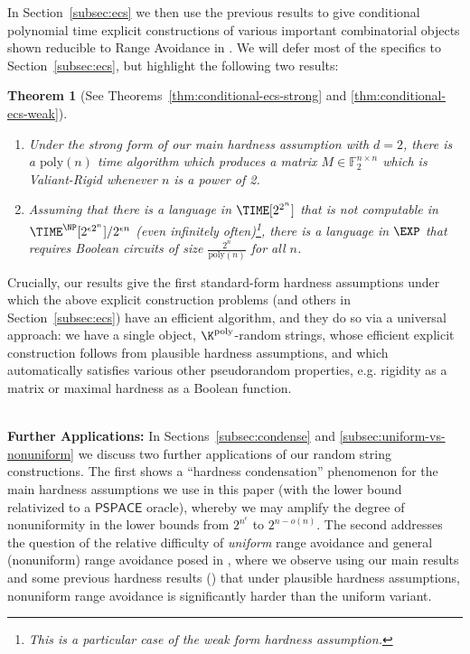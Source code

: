 \documentclass[11pt]{article}
\newtheorem*{theorem*}{Theorem}
\renewcommand{\poly}{\mathrm{poly}}
\begin{document}
In Section~\ref{subsec:ecs} we then use the previous results to give conditional polynomial time explicit constructions of various important combinatorial objects shown reducible to Range Avoidance in \cite{Korten21}. We will defer most of the specifics to Section~\ref{subsec:ecs}, but highlight the following two results:
\begin{theorem*}[See Theorems~\ref{thm:conditional-ecs-strong} and \ref{thm:conditional-ecs-weak}]
~
\begin{enumerate}
    \item Under the strong form of our main hardness assumption with $d=2$, there is a $\poly(n)$ time algorithm which produces a matrix $M \in \mathbb{F}_2^{n \times n}$ which is Valiant-Rigid whenever $n$ is a power of 2.
    \item Assuming that there is a language in $\TIME[2^{2^n}]$ that is not computable in $\TIME^\NP[2^{\epsilon 2^n}]/2^{\epsilon n}$ (even infinitely often)\footnote{This is a particular case of the weak form hardness assumption.}, there is a language in $\EXP$ that requires Boolean circuits of size $\frac{2^n}{\poly(n)}$ for all $n$.
\end{enumerate}
\end{theorem*}

Crucially, our results give the first standard-form hardness assumptions under which the above explicit construction problems (and others in Section~\ref{subsec:ecs}) have an efficient algorithm, and they do so via a universal approach: we have a single object, $\K^{\poly}$-random strings, whose efficient explicit construction follows from plausible hardness assumptions, and which automatically satisfies various other pseudorandom properties, e.g. rigidity as a matrix or maximal hardness as a Boolean function. 

~\\
{\bf \noindent Further Applications:} In Sections~\ref{subsec:condense} and \ref{subsec:uniform-vs-nonuniform} we discuss two further applications of our random string constructions. The first shows a ``hardness condensation'' phenomenon for the main hardness assumptions we use in this paper (with the lower bound relativized to a $\mathsf{PSPACE}$ oracle), whereby we may amplify the degree of nonuniformity in the lower bounds from $2^{n^{\epsilon}}$ to $2^{n - o(n)}$.
The second addresses the question of the relative difficulty of \emph{uniform} range avoidance and general (nonuniform) range avoidance posed in \cite{RSW22,ILW23}, where we observe using our main results and some previous hardness results (\cite{ILW23,ABK24}) that under plausible hardness assumptions, nonuniform range avoidance is significantly harder than the uniform variant. 
\end{document}
